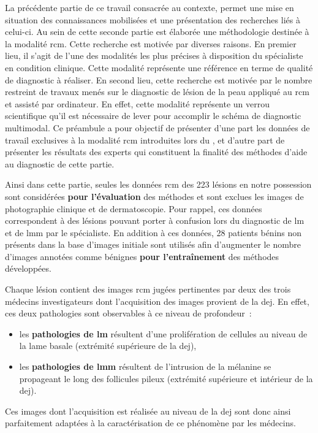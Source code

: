 \renewcommand{\thechapter}{\roman{chapter}}
\setcounter{chapter}{3}
\setcounter{figure}{0}

\label{chap:preamble_microscopy}
La précédente partie de ce travail consacrée au contexte, permet une mise en situation des connaissances mobilisées et une présentation des recherches liés à celui-ci. Au sein de cette seconde partie est élaborée une méthodologie destinée à la modalité \acrlong{rcm}. Cette recherche est motivée par diverses raisons. En premier lieu, il s'agit de l'une des modalités les plus précises à disposition du spécialiste en condition clinique. Cette modalité représente une référence en terme de qualité de diagnostic à réaliser. En second lieu, cette recherche est motivée par le nombre restreint de travaux menés sur le diagnostic de lésion de la peau appliqué au \gls{rcm} et assisté par ordinateur. En effet, cette modalité représente un verrou scientifique qu'il est nécessaire de lever pour accomplir le schéma de diagnostic multimodal. Ce préambule a pour objectif de présenter d'une part les données de travail exclusives à la modalité \gls{rcm} introduites lors du , et d'autre part de présenter les résultats des experts qui constituent la finalité des méthodes d'aide au diagnostic de cette partie.\par

Ainsi dans cette partie, seules les données \gls{rcm} des 223 lésions en notre possession sont considérées \textbf{pour l'évaluation} des méthodes et sont exclues les images de photographie clinique et de dermatoscopie. Pour rappel, ces données correspondent à des lésions pouvant porter à confusion lors du diagnostic de \gls{lm} et de \gls{lmm} par le spécialiste. En addition à ces données, 28 patients bénins non présents dans la base d'images initiale sont utilisés afin d'augmenter le nombre d'images annotées comme bénignes \textbf{pour l'entraînement} des méthodes développées.\par

Chaque lésion contient des images \gls{rcm} jugées pertinentes par deux des trois médecins investigateurs dont l'acquisition des images provient de la \gls{dej}. En effet, ces deux pathologies sont observables à ce niveau de profondeur~:
\begin{itemize}
    \item les \textbf{pathologies de \gls{lm}} résultent d'une prolifération de cellules au niveau de la lame basale (extrémité supérieure de la \gls{dej}),
    \item les \textbf{pathologies de \gls{lmm}} résultent de l'intrusion de la mélanine se propageant le long des follicules pileux (extrémité supérieure et intérieur de la \gls{dej}).
\end{itemize} Ces images dont l'acquisition est réalisée au niveau de la \gls{dej} sont donc ainsi parfaitement adaptées à la caractérisation de ce phénomène par les médecins.\par

